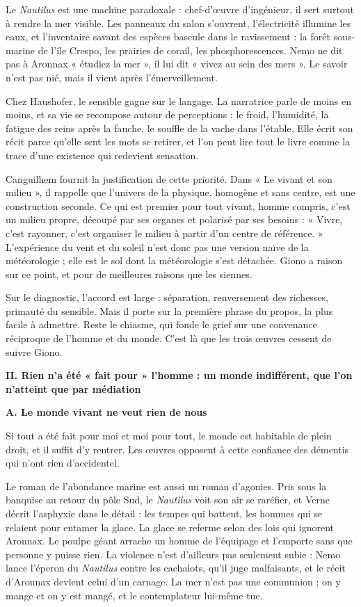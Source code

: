 \documentclass[11pt,a4paper]{article}
\begin{document}
Le \emph{Nautilus} est une machine paradoxale : chef-d'œuvre d'ingénieur, il sert surtout à rendre la mer visible. Les panneaux du salon s'ouvrent, l'électricité illumine les eaux, et l'inventaire savant des espèces bascule dans le ravissement : la forêt sous-marine de l'île Crespo, les prairies de corail, les phosphorescences. Nemo ne dit pas à Aronnax « étudiez la mer », il lui dit « vivez au sein des mers ». Le savoir n'est pas nié, mais il vient après l'émerveillement.

Chez Haushofer, le sensible gagne sur le langage. La narratrice parle de moins en moins, et sa vie se recompose autour de perceptions : le froid, l'humidité, la fatigue des reins après la fauche, le souffle de la vache dans l'étable. Elle écrit son récit parce qu'elle sent les mots se retirer, et l'on peut lire tout le livre comme la trace d'une existence qui redevient sensation.

Canguilhem fournit la justification de cette priorité. Dans « Le vivant et son milieu », il rappelle que l'univers de la physique, homogène et sans centre, est une construction seconde. Ce qui est premier pour tout vivant, homme compris, c'est un milieu propre, découpé par ses organes et polarisé par ses besoins : « Vivre, c'est rayonner, c'est organiser le milieu à partir d'un centre de référence. » L'expérience du vent et du soleil n'est donc pas une version naïve de la météorologie ; elle est le sol dont la météorologie s'est détachée. Giono a raison sur ce point, et pour de meilleures raisons que les siennes.

Sur le diagnostic, l'accord est large : séparation, renversement des richesses, primauté du sensible. Mais il porte sur la première phrase du propos, la plus facile à admettre. Reste le chiasme, qui fonde le grief sur une convenance réciproque de l'homme et du monde. C'est là que les trois œuvres cessent de suivre Giono.

\textbf{II. Rien n'a été « fait pour » l'homme : un monde indifférent, que l'on n'atteint que par médiation}

\textbf{A. Le monde vivant ne veut rien de nous}

Si tout a été fait pour moi et moi pour tout, le monde est habitable de plein droit, et il suffit d'y rentrer. Les œuvres opposent à cette confiance des démentis qui n'ont rien d'accidentel.

Le roman de l'abondance marine est aussi un roman d'agonies. Pris sous la banquise au retour du pôle Sud, le \emph{Nautilus} voit son air se raréfier, et Verne décrit l'asphyxie dans le détail : les tempes qui battent, les hommes qui se relaient pour entamer la glace. La glace se referme selon des lois qui ignorent Aronnax. Le poulpe géant arrache un homme de l'équipage et l'emporte sans que personne y puisse rien. La violence n'est d'ailleurs pas seulement subie : Nemo lance l'éperon du \emph{Nautilus} contre les cachalots, qu'il juge malfaisants, et le récit d'Aronnax devient celui d'un carnage. La mer n'est pas une communion ; on y mange et on y est mangé, et le contemplateur lui-même tue.
\end{document}
